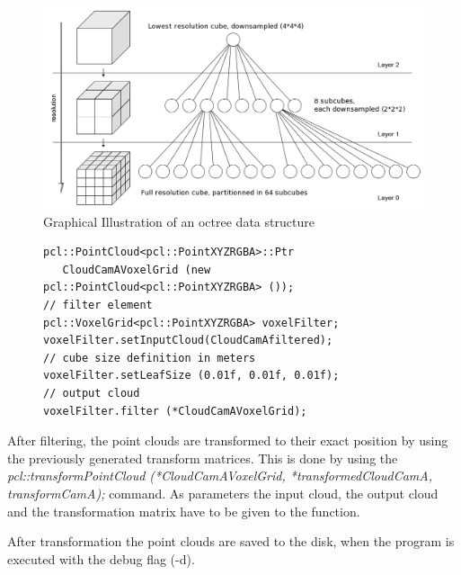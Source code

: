 \begin{figure}[H]                                      
	\centering\includegraphics[scale=0.4]{images/Octree.png}			
	\caption{Graphical Illustration of an octree data structure}
	\label{fig:octree}                      
\end{figure}
\begin{figure}[H]
\begin{lstlisting}[frame = single, caption={Voxelgrid filter to downsample the point cloud and reduce the total amount of points.}, captionpos=b, label={lst:voxelfilter}]  
pcl::PointCloud<pcl::PointXYZRGBA>::Ptr 
   CloudCamAVoxelGrid (new pcl::PointCloud<pcl::PointXYZRGBA> ()); 
// filter element
pcl::VoxelGrid<pcl::PointXYZRGBA> voxelFilter; 
voxelFilter.setInputCloud(CloudCamAfiltered);
// cube size definition in meters
voxelFilter.setLeafSize (0.01f, 0.01f, 0.01f); 
// output cloud
voxelFilter.filter (*CloudCamAVoxelGrid); 
\end{lstlisting}
\end{figure}
After filtering, the point clouds are transformed to their exact position by using the previously generated transform matrices. This is done by using the \emph{pcl::transformPointCloud (*CloudCamAVoxelGrid, *transformedCloudCamA, transformCamA);} command. As parameters the input cloud, the output cloud and the transformation matrix have to be given to the function.

After transformation the point clouds are saved to the disk, when the program is executed with the debug flag (-d).

